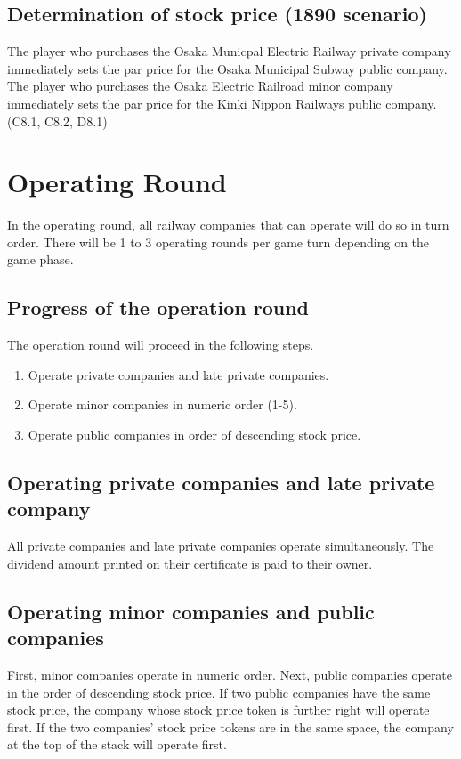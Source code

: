 \documentclass{article}
\begin{document}
\begin{CJK}{UTF8}{min}
\begin{multicols}{2}
\subsection{Determination of stock price (1890 scenario)}
The player who purchases the Osaka Municpal Electric Railway private
company immediately sets the par price for the Osaka Municipal Subway
public company. The player who purchases the Osaka Electric Railroad
minor company immediately sets the par price for the Kinki Nippon
Railways public company. (C8.1, C8.2, D8.1)



\section{Operating Round}
In the operating round, all railway companies that can operate will do
so in turn order. There will be 1 to 3 operating rounds per game turn
depending on the game phase.

\subsection{Progress of the operation round}
The operation round will proceed in the following steps.
\begin{enumerate}
\item Operate private companies and late private companies.
\item Operate minor companies in numeric order (1-5).
\item Operate public companies in order of descending stock price.
\end{enumerate}

\subsection{Operating private companies and late private company}
All private companies and late private companies operate
simultaneously.  The dividend amount printed on their certificate is
paid to their owner.

\subsection{Operating minor companies and public companies}
\label{or-operating-order}
First, minor companies operate in numeric order. Next, public
companies operate in the order of descending stock price. If two
public companies have the same stock price, the company whose stock
price token is further right will operate first. If the two companies'
stock price tokens are in the same space, the company at the top of
the stack will operate first.


\end{multicols}
\end{CJK}
\end{document}
